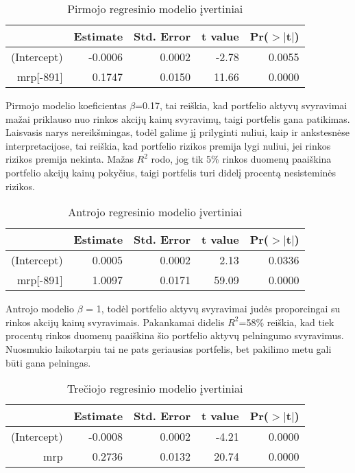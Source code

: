 \documentclass[12pt, a14paper, lithuanian]{article}
\begin{document}
\begin{table}[ht]
\begin{center}
\begin{tabular}{rrrrr}
\hline
& Estimate & Std. Error & t value & Pr($>$$|$t$|$) \\
\hline
(Intercept) & -0.0006 & 0.0002 & -2.78 & 0.0055 \\
mrp[-891] & 0.1747 & 0.0150 & 11.66 & 0.0000 \\
\hline
\end{tabular}
\end{center}
\caption{Pirmojo regresinio modelio įvertiniai}
\end{table}

Pirmojo modelio koeficientas $\beta$=0.17, tai reiškia, kad portfelio aktyvų svyravimai mažai priklauso nuo rinkos
akcijų kainų svyravimų, taigi portfelis gana patikimas. Laisvasis narys nereikšmingas, todėl galime jį prilyginti nuliui,
kaip ir ankstesnėse interpretacijose, tai reiškia, kad portfelio rizikos premija lygi nuliui, jei rinkos rizikos premija
nekinta. Mažas $R^2$ rodo, jog tik 5\% rinkos duomenų paaiškina portfelio akcijų kainų pokyčius, taigi portfelis
turi didelį procentą nesisteminės rizikos.



\begin{table}[ht]
\begin{center}
\begin{tabular}{rrrrr}
\hline
& Estimate & Std. Error & t value & Pr($>$$|$t$|$) \\
\hline
(Intercept) & 0.0005 & 0.0002 & 2.13 & 0.0336 \\
mrp[-891] & 1.0097 & 0.0171 & 59.09 & 0.0000 \\
\hline
\end{tabular}
\end{center}
\caption{Antrojo regresinio modelio įvertiniai}
\end{table}

Antrojo modelio $\beta$ = 1, todėl portfelio aktyvų svyravimai judės proporcingai su rinkos akcijų kainų svyravimais.
Pakankamai didelis $R^2$=58\% reiškia, kad tiek procentų rinkos duomenų paaiškina šio portfelio aktyvų pelningumo
svyravimus. Nuosmukio laikotarpiu tai ne pats geriausias portfelis, bet pakilimo metu gali būti gana pelningas.



\begin{table}[ht]
\begin{center}
\begin{tabular}{rrrrr}
\hline
& Estimate & Std. Error & t value & Pr($>$$|$t$|$) \\
\hline
(Intercept) & -0.0008 & 0.0002 & -4.21 & 0.0000 \\
mrp & 0.2736 & 0.0132 & 20.74 & 0.0000 \\
\hline
\end{tabular}
\end{center}
\caption{Trečiojo regresinio modelio įvertiniai}
\end{table}
\end{document}
